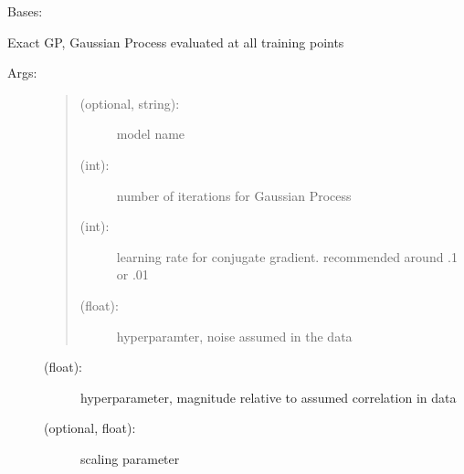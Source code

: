 \documentclass[letterpaper,10pt,english,openany,oneside]{sphinxmanual}
\begin{document}
\begin{fulllineitems}
\label{\detokenize{gp:methods.regressor.ExactGP.ExactGPRegression}}
Bases: 

Exact GP, Gaussian Process evaluated at all training points
\begin{description}
\item[{Args:}] \leavevmode\begin{quote}
\begin{description}
\item[{ (optional, string):}] \leavevmode
model name

\item[{ (int):}] \leavevmode
number of iterations for Gaussian Process

\item[{ (int):}] \leavevmode
learning rate for conjugate gradient. recommended around .1 or .01

\item[{ (float):}] \leavevmode
hyperparamter, noise assumed in the data

\end{description}
\end{quote}
\begin{description}
\item[{ (float):}] \leavevmode
hyperparameter, magnitude relative to assumed correlation in data

\item[{ (optional, float):}] \leavevmode
scaling parameter

\end{description}

\end{description}

\end{fulllineitems}
\end{document}
